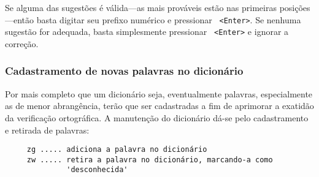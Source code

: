 Se alguma das sugestões é válida---as mais prováveis estão nas primeiras
posições---então basta digitar seu prefixo numérico e pressionar {\tt
<Enter>}. Se nenhuma sugestão for adequada, basta simplesmente pressionar {\tt
<Enter>} e ignorar a correção.

\subsubsection{Cadastramento de novas palavras no dicionário}

Por mais completo que um dicionário seja, eventualmente palavras,
especialmente as de menor abrangência, terão que ser cadastradas a fim de
aprimorar a exatidão da verificação ortográfica. A manutenção do dicionário 
dá-se pelo cadastramento e retirada de palavras:

\begin{verbatim}
     zg ..... adiciona a palavra no dicionário
     zw ..... retira a palavra no dicionário, marcando-a como 
              'desconhecida'
\end{verbatim}
